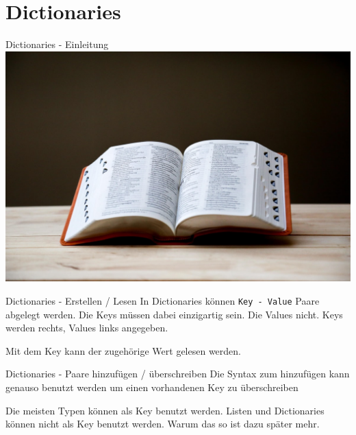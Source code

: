 \section{Dictionaries}
\begin{frame}{Dictionaries - Einleitung}
	\includegraphics[width=\linewidth]{resources/03bool_fun_dict/lexikon.jpeg}
\end{frame}
\begin{frame}{Dictionaries - Erstellen / Lesen}
	In Dictionaries können \alert{\texttt{Key - Value}} Paare abgelegt werden.
	\linebreak
	Die Keys müssen dabei einzigartig sein. Die Values nicht.
	\linebreak
	Keys werden rechts, Values links angegeben.
	
	Mit dem Key kann der zugehörige Wert gelesen werden.
	
\end{frame}
\begin{frame}{Dictionaries - Paare hinzufügen / überschreiben}
	Die Syntax zum hinzufügen kann genauso benutzt werden um einen vorhandenen Key zu überschreiben
	
	
	Die meisten Typen können als Key benutzt werden. Listen und Dictionaries können nicht als Key benutzt werden. Warum das so ist dazu später mehr.
	
\end{frame}


